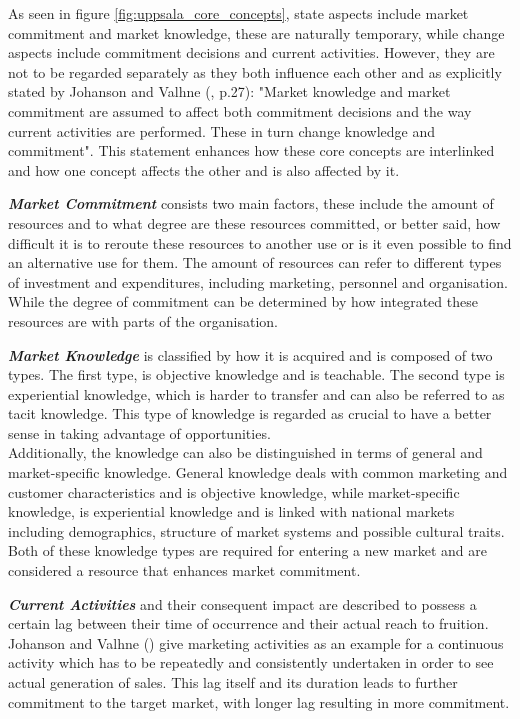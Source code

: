 \documentclass[11pt,a4paper]{article}
\begin{document}
 
As seen in figure \ref{fig:uppsala_core_concepts}, state aspects include market commitment and market knowledge, these are naturally temporary, while change aspects include commitment decisions and current activities. However, they are not to be regarded separately as they both influence each other and as explicitly stated by Johanson and Valhne (\citeyear{johansonInternationalizationProcessFirm1977}, p.27): "Market knowledge and market commitment are assumed to affect both commitment decisions and
the way current activities are performed. These in turn change knowledge and commitment". This statement enhances how these core concepts are interlinked and how one concept affects the other and is also affected by it.  \par
\textbf{\textit{Market Commitment}} consists two main factors, these include the amount of resources and to what degree are these resources committed, or better said, how difficult it is to reroute these resources to another use or is it even possible to find an alternative use for them. The amount of resources can refer to different types of investment and expenditures, including marketing, personnel and organisation. While the degree of commitment can be determined by how integrated these resources are with parts of the organisation. \par
\textbf{\textit{Market Knowledge}} is classified by how it is acquired and is composed of two types. The first type, is objective knowledge and is teachable. The second type is experiential knowledge, which is harder to transfer and can also be referred to as tacit knowledge. This type of knowledge is regarded as crucial to have a better sense in taking advantage of opportunities. \\
Additionally, the knowledge can also be distinguished in terms of general and market-specific knowledge. General knowledge deals with common marketing and customer characteristics and is objective knowledge, while market-specific knowledge, is experiential knowledge and is linked with national markets including demographics, structure of market systems and possible cultural traits. Both of these knowledge types are required for entering a new market and are considered a resource that enhances market commitment. \par
\textbf{\textit{Current Activities}} and their consequent impact are described to possess a certain lag between their time of occurrence and their actual reach to fruition. Johanson and Valhne (\citeyear{johansonInternationalizationProcessFirm1977}) give marketing activities as an example for a continuous activity which has to be repeatedly and consistently undertaken in order to see actual generation of sales. This lag itself and its duration leads to further commitment to the target market, with longer lag resulting in more commitment. \\
\end{document}
